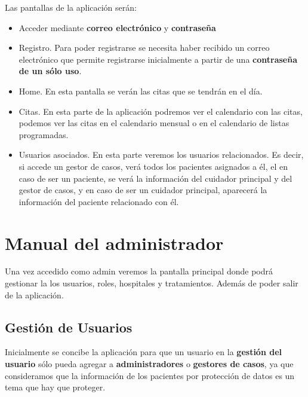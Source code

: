 Las pantallas de la aplicación serán:
\begin{itemize}
	\item Acceder mediante \textbf{correo electrónico} y \textbf{contraseña}
	\item Registro. Para poder registrarse se necesita haber recibido un correo electrónico que permite registrarse inicialmente a partir de una \textbf{contraseña de un sólo uso}.
	\item Home. En esta pantalla se verán las citas que se tendrán en el día.
	\item Citas. En esta parte de la aplicación podremos ver el calendario con las citas, podemos ver las citas en el calendario mensual o en el calendario de listas programadas.
	\item Usuarios asociados. En esta parte veremos los usuarios relacionados. Es decir, si accede un gestor de casos, verá todos los pacientes asignados a él, el en caso de ser un paciente, se verá la información del cuidador principal y del gestor de casos, y en caso de ser un cuidador principal, aparecerá la información del paciente relacionado con él. 
\end{itemize}

\section{Manual del administrador}
Una vez accedido como admin veremos la pantalla principal donde podrá gestionar la los usuarios, roles, hospitales y tratamientos. Además de poder salir de la aplicación.

\subsection{Gestión de Usuarios}
Inicialmente se concibe la aplicación para que un usuario en la \textbf{gestión del usuario} sólo pueda agregar a \textbf{administradores} o \textbf{gestores de casos}, ya que consideramos que la información de los pacientes por protección de datos es un tema que hay que proteger.

